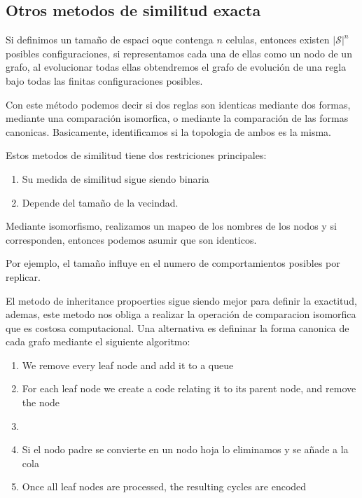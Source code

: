 \subsection{Otros metodos de similitud exacta}

Si definimos un tamaño de espaci oque contenga $n$ celulas, entonces existen $|\mathcal{S}|^n$ posibles configuraciones, si representamos cada una de ellas como un nodo de un grafo, al evolucionar todas ellas obtendremos el grafo de evolución de una regla bajo todas las finitas configuraciones posibles. 

Con este método podemos decir si dos reglas son identicas mediante dos formas, mediante una comparación isomorfica, o mediante la comparación de las formas canonicas. Basicamente, identificamos si la topologia de ambos es la misma. 

Estos metodos de similitud tiene dos restriciones principales:
\begin{enumerate}
	\item Su medida de similitud sigue siendo binaria
	\item Depende del tamaño de la vecindad. 
\end{enumerate}

Mediante isomorfismo, realizamos un mapeo de los nombres de los nodos y si corresponden, entonces podemos asumir que son identicos.



Por ejemplo, el tamaño influye en el numero de comportamientos posibles por replicar. 

El metodo de inheritance propoerties sigue siendo mejor para definir la exactitud, ademas, este metodo nos obliga a realizar la operación de comparacion isomorfica que es costosa computacional. Una alternativa es defininar la forma canonica de cada grafo mediante el siguiente algoritmo:

\begin{enumerate}
	\item We remove every leaf node and add it to a queue
	\item For each leaf node we create a code relating it to its parent node, and remove the node
	\item \item Si el nodo padre se convierte en un nodo hoja lo eliminamos y se añade a la cola
	\item Once all leaf nodes are processed, the resulting cycles are encoded
	
\end{enumerate}

